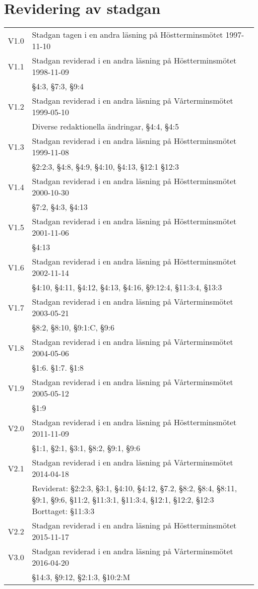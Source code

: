 \documentclass[10pt]{article}
\begin{document}
    \newpage
    \section*{Revidering av stadgan}
    
    \renewcommand*\arraystretch{1}
    \begin{tabular}{p{7mm} p{110mm}}
        V1.0 & Stadgan tagen i en andra läsning på Höstterminsmötet 1997-11-10\\
        V1.1 & Stadgan reviderad i en andra läsning på Höstterminsmötet 1998-11-09\\
        & §4:3, §7:3, §9:4\\
        V1.2 & Stadgan reviderad i en andra läsning på Vårterminsmötet 1999-05-10\\
        & Diverse redaktionella ändringar, §4:4, §4:5 \\
        V1.3 & Stadgan reviderad i en andra läsning på Höstterminsmötet 1999-11-08\\
        & §2:2:3, §4:8, §4:9, §4:10, §4:13, §12:1 §12:3\\
        V1.4 & Stadgan reviderad i en andra läsning på Höstterminsmötet 2000-10-30\\
        & §7:2, §4:3, §4:13\\
        V1.5 & Stadgan reviderad i en andra läsning på Höstterminsmötet 2001-11-06\\
        & §4:13\\
        V1.6 & Stadgan reviderad i en andra läsning på Höstterminsmötet 2002-11-14\\
        & §4:10, §4:11, §4:12, §4:13, §4:16, §9:12:4, §11:3:4, §13:3\\
        V1.7 & Stadgan reviderad i en andra läsning på Vårterminsmötet 2003-05-21\\
        & §8:2, §8:10, §9:1:C, §9:6 \\
        V1.8 & Stadgan reviderad i en andra läsning på Vårterminsmötet 2004-05-06\\
        & §1:6. §1:7. §1:8	\\
        V1.9 & Stadgan reviderad i en andra läsning på Vårterminsmötet 2005-05-12\\
        & §1:9\\
        V2.0 & Stadgan reviderad i en andra läsning på Höstterminsmötet 2011-11-09\\
        & §1:1, §2:1, §3:1, §8:2, §9:1, §9:6\\
         V2.1 & Stadgan reviderad i en andra läsning på Vårterminsmötet 2014-04-18\\
        & Reviderat: §2:2:3, §3:1, §4:10, §4:12, §7.2, §8:2, §8:4, §8:11, §9:1, §9:6, §11:2, §11:3:1,
        §11:3:4, §12:1, §12:2, §12:3
        Borttaget: §11:3:3\\
        V2.2 & Stadgan reviderad i en andra läsning på Höstterminsmötet 2015-11-17\\
        V3.0 & Stadgan reviderad i en andra läsning på Vårterminsmötet 2016-04-20\\
        & \S14:3, \S9:12, \S2:1:3, \S10:2:M\\
    \end{tabular}
    \renewcommand*\arraystretch{1.3}
    
\end{document}
